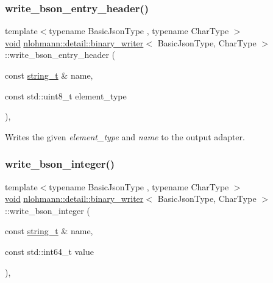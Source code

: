 \subsubsection{\texorpdfstring{write\_bson\_entry\_header()}{write\_bson\_entry\_header()}}
{\footnotesize\ttfamily template$<$typename Basic\+Json\+Type , typename Char\+Type $>$ \\
\mbox{\hyperlink{namespacenlohmann_1_1detail_a59fca69799f6b9e366710cb9043aa77d}{void}} \mbox{\hyperlink{classnlohmann_1_1detail_1_1binary__writer}{nlohmann\+::detail\+::binary\+\_\+writer}}$<$ Basic\+Json\+Type, Char\+Type $>$\+::write\+\_\+bson\+\_\+entry\+\_\+header (\begin{DoxyParamCaption}\item[{const \mbox{\hyperlink{classnlohmann_1_1detail_1_1binary__writer_a29f2ae7a5c4a8c1dae47b3b2310de8a8}{string\+\_\+t}} \&}]{name,  }\item[{const std\+::uint8\+\_\+t}]{element\+\_\+type }\end{DoxyParamCaption})\hspace{0.3cm}{\ttfamily [inline]}, {\ttfamily [private]}}



Writes the given {\itshape element\+\_\+type} and {\itshape name} to the output adapter. 

\mbox{\label{classnlohmann_1_1detail_1_1binary__writer_a553ad4dbdf27238eef90867e4bf2f3e5}} 
\subsubsection{\texorpdfstring{write\_bson\_integer()}{write\_bson\_integer()}}
{\footnotesize\ttfamily template$<$typename Basic\+Json\+Type , typename Char\+Type $>$ \\
\mbox{\hyperlink{namespacenlohmann_1_1detail_a59fca69799f6b9e366710cb9043aa77d}{void}} \mbox{\hyperlink{classnlohmann_1_1detail_1_1binary__writer}{nlohmann\+::detail\+::binary\+\_\+writer}}$<$ Basic\+Json\+Type, Char\+Type $>$\+::write\+\_\+bson\+\_\+integer (\begin{DoxyParamCaption}\item[{const \mbox{\hyperlink{classnlohmann_1_1detail_1_1binary__writer_a29f2ae7a5c4a8c1dae47b3b2310de8a8}{string\+\_\+t}} \&}]{name,  }\item[{const std\+::int64\+\_\+t}]{value }\end{DoxyParamCaption})\hspace{0.3cm}{\ttfamily [inline]}, {\ttfamily [private]}}



